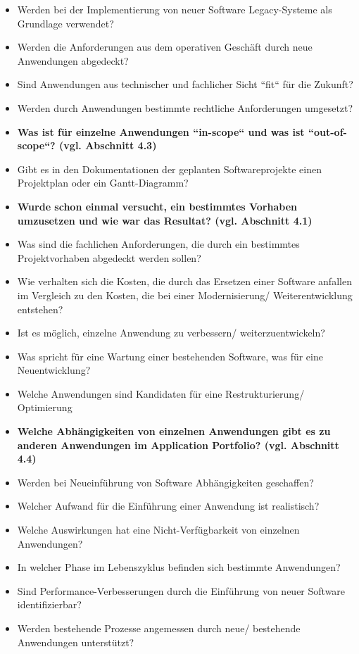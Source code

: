 \begin{itemize}
\item Werden bei der Implementierung von neuer Software Legacy-Systeme als Grundlage verwendet?
\item Werden die Anforderungen aus dem operativen Geschäft durch neue Anwendungen abgedeckt?
\item Sind Anwendungen aus technischer und fachlicher Sicht ``fit`` für die Zukunft?
\item Werden durch Anwendungen bestimmte rechtliche Anforderungen umgesetzt?
\item {\bf Was ist für einzelne Anwendungen ``in-scope`` und was ist ``out-of-scope``? (vgl. Abschnitt 4.3)}
\item Gibt es in den Dokumentationen der geplanten Softwareprojekte einen Projektplan oder ein Gantt-Diagramm?
\item {\bf Wurde schon einmal versucht, ein bestimmtes Vorhaben umzusetzen und wie war das Resultat? (vgl. Abschnitt 4.1)}
\item Was sind die fachlichen Anforderungen, die durch ein bestimmtes Projektvorhaben abgedeckt werden sollen?
\item Wie verhalten sich die Kosten, die durch das Ersetzen einer Software anfallen im Vergleich zu den Kosten, die bei einer Modernisierung/ Weiterentwicklung entstehen?
\item Ist es möglich, einzelne Anwendung zu verbessern/ weiterzuentwickeln?
\item Was spricht für eine Wartung einer bestehenden Software, was für eine Neuentwicklung?
\item Welche Anwendungen sind Kandidaten für eine Restrukturierung/ Optimierung
\item {\bf Welche Abhängigkeiten von einzelnen Anwendungen gibt es zu anderen Anwendungen im Application Portfolio? (vgl. Abschnitt 4.4)}
\item Werden bei Neueinführung von Software Abhängigkeiten geschaffen?
\item Welcher Aufwand für die Einführung einer Anwendung ist realistisch?
\item Welche Auswirkungen hat eine Nicht-Verfügbarkeit von einzelnen Anwendungen?
\item In welcher Phase im Lebenszyklus befinden sich bestimmte Anwendungen?
\item Sind Performance-Verbesserungen durch die Einführung von neuer Software identifizierbar?
\item Werden bestehende Prozesse angemessen durch neue/ bestehende Anwendungen unterstützt?

\end{itemize}
